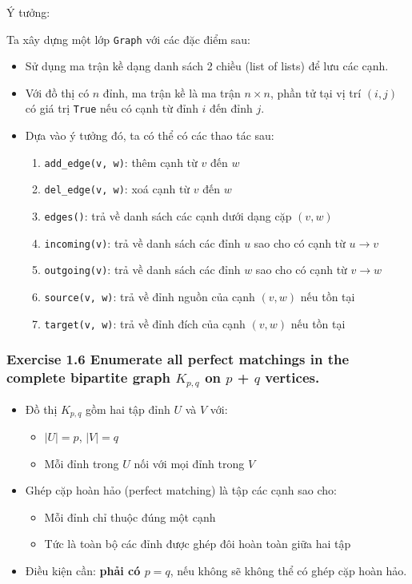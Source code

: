 \documentclass{article}
\begin{document}
	Ý tưởng:
	
	Ta xây dựng một lớp \texttt{Graph} với các đặc điểm sau:
	
	\begin{itemize}
		\item Sử dụng ma trận kề dạng danh sách 2 chiều (list of lists) để lưu các cạnh. 
		\item Với đồ thị có $n$ đỉnh, ma trận kề là ma trận $n \times n$, phần tử tại vị trí $(i, j)$ có giá trị \texttt{True} nếu có cạnh từ đỉnh $i$ đến đỉnh $j$.
		\item Dựa vào ý tưởng đó, ta có thể có các thao tác sau:
		\begin{enumerate}
			\item \texttt{add\_edge(v, w)}: thêm cạnh từ $v$ đến $w$
			\item \texttt{del\_edge(v, w)}: xoá cạnh từ $v$ đến $w$
			\item \texttt{edges()}: trả về danh sách các cạnh dưới dạng cặp $(v, w)$
			\item \texttt{incoming(v)}: trả về danh sách các đỉnh $u$ sao cho có cạnh từ $u \to v$
			\item \texttt{outgoing(v)}: trả về danh sách các đỉnh $w$ sao cho có cạnh từ $v \to w$
			\item \texttt{source(v, w)}: trả về đỉnh nguồn của cạnh $(v, w)$ nếu tồn tại
			\item \texttt{target(v, w)}: trả về đỉnh đích của cạnh $(v, w)$ nếu tồn tại
		\end{enumerate}
	\end{itemize}
	
	\subsubsection*{Exercise 1.6 Enumerate all perfect matchings in the complete bipartite graph $K_{p,q}$ on $p$ + $q$ vertices.}
	
	\begin{itemize}
		\item Đồ thị $K_{p,q}$ gồm hai tập đỉnh $U$ và $V$ với:
		\begin{itemize}
			\item $|U| = p$, $|V| = q$
			\item Mỗi đỉnh trong $U$ nối với mọi đỉnh trong $V$
		\end{itemize}
		\item Ghép cặp hoàn hảo (perfect matching) là tập các cạnh sao cho:
		\begin{itemize}
			\item Mỗi đỉnh chỉ thuộc đúng một cạnh
			\item Tức là toàn bộ các đỉnh được ghép đôi hoàn toàn giữa hai tập
		\end{itemize}
		\item Điều kiện cần: \textbf{phải có $p = q$}, nếu không sẽ không thể có ghép cặp hoàn hảo.
	\end{itemize}
	
\end{document}
